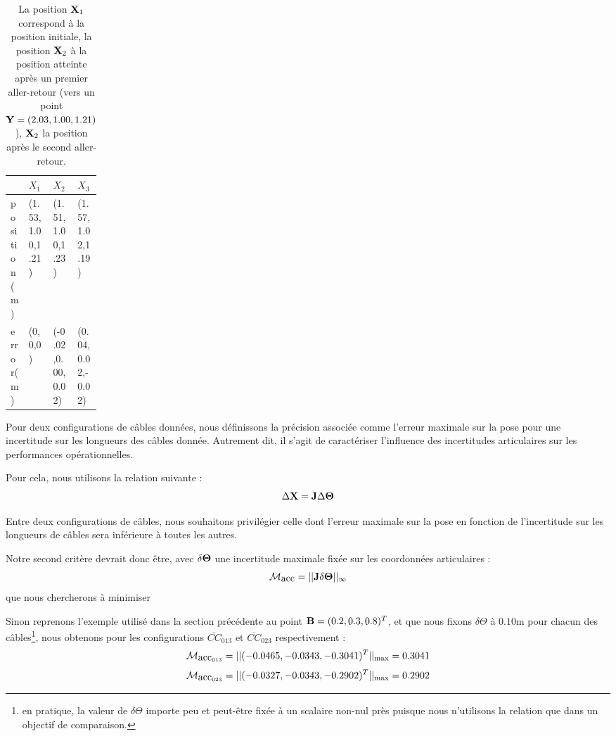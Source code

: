 \begin{table}[!h]
\begin{tabularx}{0.95\linewidth}{|p{0.15\linewidth}|X|X|X|}
\hline
& $X_1 $ & $X_2$ & $X_3$ \\
\hline
position(m) & (1.53,1.00,1.21) & (1.51,1.00,1.23) & (1.57,1.02,1.19)\\
\hline
error(m) & (0,0,0) & (-0.02,0.00,0.02) & (0.04,0.02,-0.02) \\
\hline
\end{tabularx}
\caption{La position ${\bf X}_1$ correspond \`a la position initiale, la 
position ${\bf X}_2$ \`a la position atteinte apr\`es un premier aller-retour 
(vers un point ${\bf Y} = (2.03,1.00,1.21)$), ${\bf X}_2$ la position apr\`es 
le second aller-retour.} 
\label{chap01:tab01}
\end{table}

Pour deux configurations de c\^ables donn\'ees, nous d\'efinissons la 
pr\'ecision associ\'ee comme l'erreur maximale sur la pose pour une incertitude 
sur les longueurs des c\^ables donn\'ee. Autrement dit, il s'agit de 
caract\'eriser l'influence des incertitudes articulaires sur les performances 
op\'erationnelles.

Pour cela, nous utilisons la relation suivante :
\begin{equation}
\Delta {\bf X} = {\bf J} \Delta {\bf \Theta}
\label{chap01:eq10}
\end{equation}

Entre deux configurations de c\^ables, nous souhaitons privil\'egier celle dont 
l'erreur maximale sur la pose en fonction de l'incertitude sur les longueurs de 
c\^ables sera inf\'erieure \`a toutes les autres.

Notre second crit\`ere devrait donc \^etre, avec $\delta {\bf \Theta}$ une 
incertitude maximale fix\'ee sur les coordonn\'ees articulaires :
\begin{equation}
\mathcal M_{\hbox{acc}} = ||{\bf J}  \delta {\bf \Theta} ||_{\infty}
\label{chap01:eq11}
\end{equation}
que nous chercherons \`a minimiser

Sinon reprenons l'exemple utilis\'e dans la section pr\'ec\'edente au point 
${\bf B} = (0.2,0.3,0.8)^T$, et que nous fixons $\delta \Theta$ \`a $0.10$m 
pour chacun des c\^ables\footnote{en pratique, la valeur de $\delta \Theta$ 
importe peu et peut-\^etre fix\'ee \`a un scalaire non-nul pr\`es 
puisque nous n'utilisons la relation que dans un objectif de comparaison.}, 
nous obtenons pour les configurations $\overline{CC}_{013}$ et 
$\overline{CC}_{023}$ respectivement :
$$\mathcal M_{\hbox{acc}_{013}} = ||(-0.0465, -0.0343, -0.3041)^T||_{\max} = 
0.3041$$ 
$$\mathcal M_{\hbox{acc}_{023}} = ||(-0.0327,-0.0343,-0.2902)^T||_{\max} = 
0.2902$$

